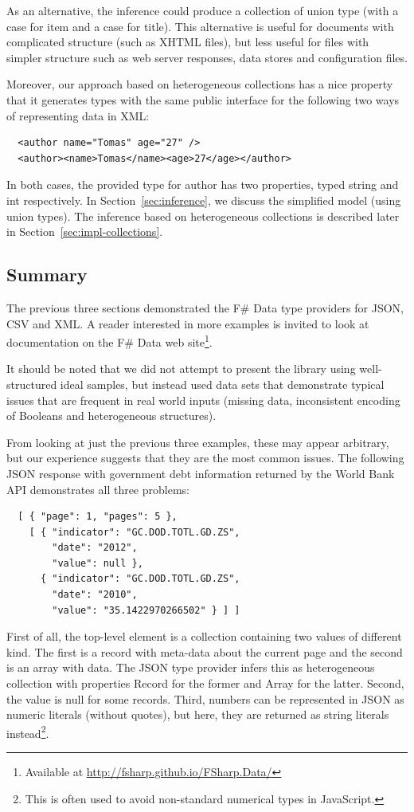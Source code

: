 \documentclass[preprint]{sigplanconf}
\newcommand{\kvd}[1]{\textnormal{\textcolor{kvdclr}{\sffamily #1}}}
\newcommand{\ident}[1]{\textnormal{\sffamily #1}}
\begin{document}
As an alternative, the inference could produce a collection of union type (with a case for \ident{item}
and a case for \ident{title}). This alternative is useful for documents with complicated structure 
(such as XHTML files), but less useful for files with simpler structure such as web server responses,
data stores and configuration files. 

Moreover, our approach based on heterogeneous collections has a nice property that it generates types
with the same public interface for the following two ways of representing data in XML:
%
{\small{
\begin{verbatim}
  <author name="Tomas" age="27" />
  <author><name>Tomas</name><age>27</age></author>
\end{verbatim}
}}
%
\noindent
In both cases, the provided type for \ident{author} has two properties, typed \ident{string} and 
\ident{int} respectively. In Section~\ref{sec:inference}, we discuss the simplified model (using 
union types). The inference based on heterogeneous collections is described later in 
Section~\ref{sec:impl-collections}.


\subsection{Summary}
The previous three sections demonstrated the F\# Data type providers for JSON, CSV and XML.
A reader interested in more examples is invited to look at documentation on the F\# Data web 
site\footnote{Available at \url{http://fsharp.github.io/FSharp.Data/}}.

It should be noted that we did not attempt to present the library using well-structured ideal 
samples, but instead used data sets that demonstrate typical issues that are frequent in real 
world inputs (missing data, inconsistent encoding of Booleans and heterogeneous structures).

From looking at just the previous three examples, these may appear arbitrary, but our experience
suggests that they are the most common issues. The following JSON response with government debt
information returned by the World Bank API demonstrates all three problems:
%
{\small{
\begin{verbatim}
  [ { "page": 1, "pages": 5 },
    [ { "indicator": "GC.DOD.TOTL.GD.ZS",
        "date": "2012",
        "value": null },
      { "indicator": "GC.DOD.TOTL.GD.ZS",
        "date": "2010",
        "value": "35.1422970266502" } ] ]
\end{verbatim}
}}
%
\noindent
First of all, the top-level element is a collection containing two values of different kind.
The first is a record with meta-data about the current page and the second is an array with data. 
The JSON type provider infers this as heterogeneous collection with properties \ident{Record}
for the former and \ident{Array} for the latter. Second, the \ident{value} is \kvd{null} for some
records. Third, numbers can be represented in JSON as numeric literals (without quotes), but
here, they are returned as string literals instead\footnote{This is often used to avoid non-standard
numerical types in JavaScript.}.
\end{document}
